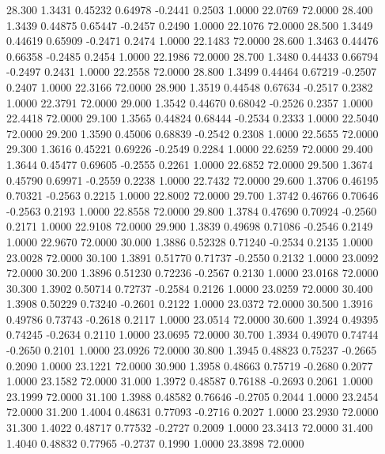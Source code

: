   28.300   1.3431   0.45232   0.64978  -0.2441   0.2503   1.0000  22.0769  72.0000
  28.400   1.3439   0.44875   0.65447  -0.2457   0.2490   1.0000  22.1076  72.0000
  28.500   1.3449   0.44619   0.65909  -0.2471   0.2474   1.0000  22.1483  72.0000
  28.600   1.3463   0.44476   0.66358  -0.2485   0.2454   1.0000  22.1986  72.0000
  28.700   1.3480   0.44433   0.66794  -0.2497   0.2431   1.0000  22.2558  72.0000
  28.800   1.3499   0.44464   0.67219  -0.2507   0.2407   1.0000  22.3166  72.0000
  28.900   1.3519   0.44548   0.67634  -0.2517   0.2382   1.0000  22.3791  72.0000
  29.000   1.3542   0.44670   0.68042  -0.2526   0.2357   1.0000  22.4418  72.0000
  29.100   1.3565   0.44824   0.68444  -0.2534   0.2333   1.0000  22.5040  72.0000
  29.200   1.3590   0.45006   0.68839  -0.2542   0.2308   1.0000  22.5655  72.0000
  29.300   1.3616   0.45221   0.69226  -0.2549   0.2284   1.0000  22.6259  72.0000
  29.400   1.3644   0.45477   0.69605  -0.2555   0.2261   1.0000  22.6852  72.0000
  29.500   1.3674   0.45790   0.69971  -0.2559   0.2238   1.0000  22.7432  72.0000
  29.600   1.3706   0.46195   0.70321  -0.2563   0.2215   1.0000  22.8002  72.0000
  29.700   1.3742   0.46766   0.70646  -0.2563   0.2193   1.0000  22.8558  72.0000
  29.800   1.3784   0.47690   0.70924  -0.2560   0.2171   1.0000  22.9108  72.0000
  29.900   1.3839   0.49698   0.71086  -0.2546   0.2149   1.0000  22.9670  72.0000
  30.000   1.3886   0.52328   0.71240  -0.2534   0.2135   1.0000  23.0028  72.0000
  30.100   1.3891   0.51770   0.71737  -0.2550   0.2132   1.0000  23.0092  72.0000
  30.200   1.3896   0.51230   0.72236  -0.2567   0.2130   1.0000  23.0168  72.0000
  30.300   1.3902   0.50714   0.72737  -0.2584   0.2126   1.0000  23.0259  72.0000
  30.400   1.3908   0.50229   0.73240  -0.2601   0.2122   1.0000  23.0372  72.0000
  30.500   1.3916   0.49786   0.73743  -0.2618   0.2117   1.0000  23.0514  72.0000
  30.600   1.3924   0.49395   0.74245  -0.2634   0.2110   1.0000  23.0695  72.0000
  30.700   1.3934   0.49070   0.74744  -0.2650   0.2101   1.0000  23.0926  72.0000
  30.800   1.3945   0.48823   0.75237  -0.2665   0.2090   1.0000  23.1221  72.0000
  30.900   1.3958   0.48663   0.75719  -0.2680   0.2077   1.0000  23.1582  72.0000
  31.000   1.3972   0.48587   0.76188  -0.2693   0.2061   1.0000  23.1999  72.0000
  31.100   1.3988   0.48582   0.76646  -0.2705   0.2044   1.0000  23.2454  72.0000
  31.200   1.4004   0.48631   0.77093  -0.2716   0.2027   1.0000  23.2930  72.0000
  31.300   1.4022   0.48717   0.77532  -0.2727   0.2009   1.0000  23.3413  72.0000
  31.400   1.4040   0.48832   0.77965  -0.2737   0.1990   1.0000  23.3898  72.0000
